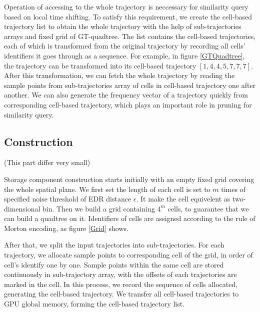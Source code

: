 \documentclass[conference]{IEEEtran}
\begin{document}
Operation of accessing to the whole trajectory is neccessary for similarity query based on local time shifting. To satisfy this requirement, we create the cell-based trajectory list to obtain the whole trajectory with the help of sub-trajectories arrays and fixed grid of GT-quadtree. The list contains the cell-based trajectories, each of which is transformed from the original trajectory by recording all cells' identifiers it goes through as a sequence. For example, in figure \ref{GTQuadtree}, the trajectory can be transformed into its cell-based trajectory $[1,4,4,5,7,7,7]$. After this transformation, we can fetch the whole trajectory by reading the sample points from sub-trajectories array of cells in cell-based trajectory one after another. We can also generate the frequency vector of a trajectory quickly from corresponding cell-based trajectory, which plays an important role in pruning for similarity query.

\subsection{Construction}

(This part differ very small)

Storage component construction starts initially with an empty fixed grid covering the whole spatial plane. We first set the length of each cell is set to $m$ times of specified noise threshold of EDR distance $\epsilon$. It make the cell equivelent as two-dimensional bin. Then we build a grid containing $4^{m}$ cells, to guarantee that we can build a quadtree on it. Identifiers of cells are assigned according to the rule of Morton encoding, as figure \ref{Grid} shows.

After that, we split the input trajectories into sub-trajectories. For each trajectory, we allocate sample points to corresponding cell of the grid, in order of cell's identify one by one. Sample points within the same cell are stored continuously in sub-trajectory array, with the offsets of each trajectories are marked in the cell. In this process, we record the sequence of cells allocated, generating the cell-based trajectory. We transfer all cell-based trajectories to GPU global memory, forming the cell-based trajectory list. 
\end{document}
